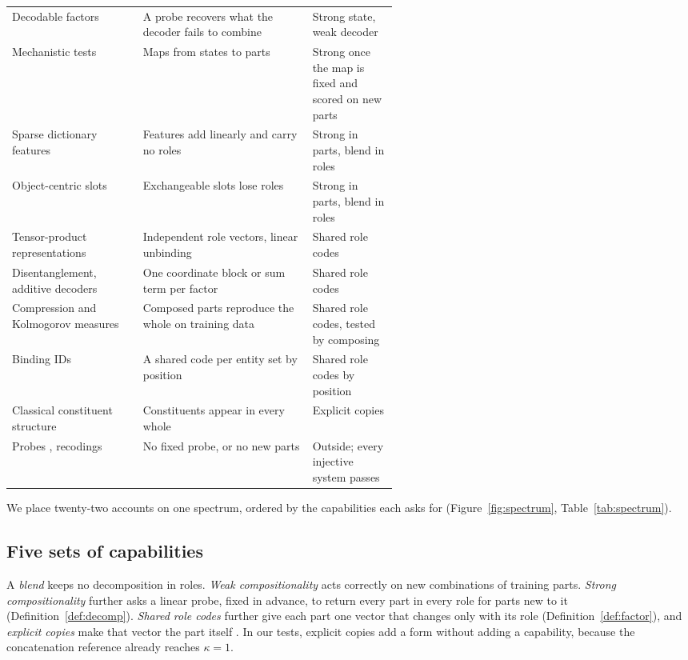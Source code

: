 \begin{table}[tp]
\begin{tabularx}{\linewidth}{@{}P{0.34\linewidth}YP{0.22\linewidth}@{}}
    Decodable factors \citep{montero2021} & A probe recovers what the decoder fails to combine & Strong state, weak decoder \\
    Mechanistic tests \citep{lepori2023,geiger2021,geiger2024das,mccoy2019} & Maps from states to parts & Strong once the map is fixed and scored on new parts \\
    Sparse dictionary features \citep{cunningham2023sparse,bricken2023monosemanticity,park2024linear} & Features add linearly and carry no roles & Strong in parts, blend in roles \\
    Object-centric slots \citep{locatello2020slot} & Exchangeable slots lose roles & Strong in parts, blend in roles \\
    \addlinespace
    Tensor-product representations \citep{smolensky1990} & Independent role vectors, linear unbinding & Shared role codes \\
    Disentanglement, additive decoders \citep{bengio2013,lachapelle2023,wiedemer2024} & One coordinate block or sum term per factor & Shared role codes \\
    Compression and Kolmogorov measures \citep{andreas2019,elmoznino2024,elmoznino2026} & Composed parts reproduce the whole on training data & Shared role codes, tested by composing \\
    Binding IDs \citep{feng2024} & A shared code per entity set by position & Shared role codes by position \\
    \addlinespace
    Classical constituent structure \citep{fodor1988} & Constituents appear in every whole & Explicit copies \\
    \addlinespace
    Probes \citep{belinkov2022,hewitt2019}, recodings \citep{zadrozny1994} & No fixed probe, or no new parts & Outside; every injective system passes \\
    \bottomrule
  \end{tabularx}
\end{table}

We place twenty-two accounts on one spectrum, ordered by the capabilities each asks for (Figure~\ref{fig:spectrum}, Table~\ref{tab:spectrum}).

\subsection{Five sets of capabilities}
\label{app:sets}

A \emph{blend} keeps no decomposition in roles. \emph{Weak compositionality} acts correctly on new combinations of training parts. \emph{Strong compositionality} further asks a linear probe, fixed in advance, to return every part in every role for parts new to it (Definition~\ref{def:decomp}). \emph{Shared role codes} further give each part one vector that changes only with its role (Definition~\ref{def:factor}), and \emph{explicit copies} make that vector the part itself \citep{fodor1988}. In our tests, explicit copies add a form without adding a capability, because the concatenation reference already reaches $\kappa = 1$.


